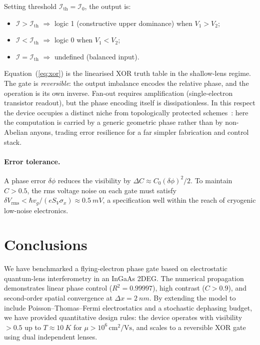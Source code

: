 \documentclass[11pt,a4paper]{article}
\begin{document}
Setting threshold $\mathcal{I}_{\text{th}}=\mathcal{I}_0$, the output is:
\begin{itemize}
  \item $\mathcal{I}>\mathcal{I}_{\text{th}}$ $\Rightarrow$ logic 1 (constructive 
  upper dominance) when $V_1>V_2$;
  \item $\mathcal{I}<\mathcal{I}_{\text{th}}$ $\Rightarrow$ logic 0 when $V_1<V_2$;
  \item $\mathcal{I}=\mathcal{I}_{\text{th}}$ $\Rightarrow$ undefined (balanced 
  input).
\end{itemize}

Equation~(\ref{eq:xor}) is the linearised XOR truth table in the shallow-lens 
regime. The gate is \emph{reversible}: the output imbalance encodes the 
relative phase, and the operation is its own inverse. Fan-out requires 
amplification (single-electron transistor readout), but the phase encoding 
itself is dissipationless. In this respect the device occupies a distinct 
niche from topologically protected schemes~\cite{nayak2008}: here the 
computation is carried by a generic geometric phase rather than by non-Abelian 
anyons, trading error resilience for a far simpler fabrication and control 
stack.

\paragraph{Error tolerance.} A phase error $\delta\phi$ reduces the visibility 
by $\Delta C \approx C_0(\delta\phi)^2/2$. To maintain $C>0.5$, the rms 
voltage noise on each gate must satisfy 
$\delta V_{\text{rms}} < \hbar v_g/(e S_V \sigma_x) \approx \SI{0.5}{mV}$, a 
specification well within the reach of cryogenic low-noise electronics.

\section{Conclusions}
\label{sec:concl}

We have benchmarked a flying-electron phase gate based on electrostatic 
quantum-lens interferometry in an InGaAs 2DEG. The numerical propagation 
demonstrates linear phase control ($R^2=0.99997$), high contrast ($C>0.9$), 
and second-order spatial convergence at $\Delta x=\SI{2}{nm}$. By extending 
the model to include Poisson--Thomas--Fermi electrostatics and a stochastic 
dephasing budget, we have provided quantitative design rules: the device 
operates with visibility $>0.5$ up to $T\approx\SI{10}{K}$ for 
$\mu>10^6\,\text{cm}^2\text{/Vs}$, and scales to a reversible XOR gate using 
dual independent lenses.
\end{document}
